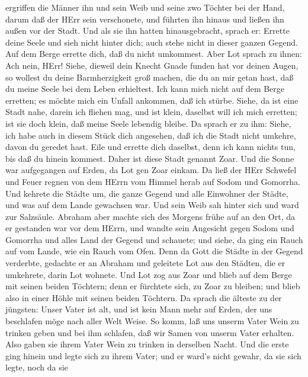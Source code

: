 ergriffen die Männer ihn und sein Weib und seine zwo Töchter bei der
Hand, darum daß der HErr sein verschonete, und führten ihn hinaus und
ließen ihn außen vor der Stadt.  Und als sie ihn hatten
hinausgebracht, sprach er: Errette deine Seele und sieh nicht hinter
dich; auch stehe nicht in dieser ganzen Gegend. Auf dem Berge errette
dich, daß du nicht umkommest.  Aber Lot sprach zu ihnen:
Ach nein, HErr!  Siehe, dieweil dein Knecht Gnade funden
hat vor deinen Augen, so wollest du deine Barmherzigkeit groß machen,
die du an mir getan hast, daß du meine Seele bei dem Leben erhieltest.
Ich kann mich nicht auf dem Berge erretten; es möchte mich ein Unfall
ankommen, daß ich stürbe.  Siehe, da ist eine Stadt nahe,
darein ich fliehen mag, und ist klein, daselbst will ich mich erretten;
ist sie doch klein, daß meine Seele lebendig bleibe.  Da
sprach er zu ihm: Siehe, ich habe auch in diesem Stück dich angesehen,
daß ich die Stadt nicht umkehre, davon du geredet hast. 
Eile und errette dich daselbst, denn ich kann nichts tun, bis daß du
hinein kommest. Daher ist diese Stadt genannt Zoar.  Und
die Sonne war aufgegangen auf Erden, da Lot gen Zoar einkam.
 Da ließ der HErr Schwefel und Feuer regnen von dem HErrn
vom Himmel herab auf Sodom und Gomorrha.  Und kehrete die
Städte um, die ganze Gegend und alle Einwohner der Städte, und was auf
dem Lande gewachsen war.  Und sein Weib sah hinter sich und
ward zur Salzsäule.  Abraham aber machte sich des Morgens
frühe auf an den Ort, da er gestanden war vor dem HErrn, 
und wandte sein Angesicht gegen Sodom und Gomorrha und alles Land der
Gegend und schauete; und siehe, da ging ein Rauch auf vom Lande, wie ein
Rauch vom Ofen.  Denn da Gott die Städte in der Gegend
verderbte, gedachte er an Abraham und geleitete Lot aus den Städten, die
er umkehrete, darin Lot wohnete.  Und Lot zog aus Zoar und
blieb auf dem Berge mit seinen beiden Töchtern; denn er fürchtete sich,
zu Zoar zu bleiben; und blieb also in einer Höhle mit seinen beiden
Töchtern.  Da sprach die älteste zu der jüngsten: Unser
Vater ist alt, und ist kein Mann mehr auf Erden, der uns beschlafen möge
nach aller Welt Weise.  So komm, laß uns unserm Vater Wein
zu trinken geben und bei ihm schlafen, daß wir Samen von unserm Vater
erhalten.  Also gaben sie ihrem Vater Wein zu trinken in
derselben Nacht. Und die erste ging hinein und legte sich zu ihrem
Vater; und er ward's nicht gewahr, da sie sich legte, noch da sie
